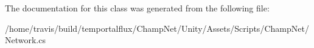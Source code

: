 The documentation for this class was generated from the following file\-:\begin{DoxyCompactItemize}
\item 
/home/travis/build/temportalflux/\-Champ\-Net/\-Unity/\-Assets/\-Scripts/\-Champ\-Net/Network.\-cs\end{DoxyCompactItemize}
